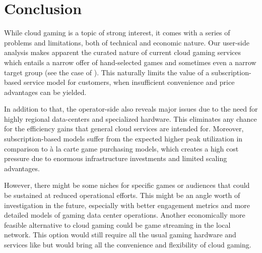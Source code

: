\section{Conclusion}
\label{sec:conclusion}

While cloud gaming is a topic of strong interest, it comes with a series of problems and limitations, both of technical and economic nature. Our user-side analysis makes apparent the curated nature of current cloud gaming services which entails a narrow offer of hand-selected games and sometimes even a narrow target group (see the case of \psnow). This naturally limits the value of a subscription-based service model for customers, when insufficient convenience and price advantages can be yielded.

In addition to that, the operator-side also reveals major issues due to the need for highly regional data-centers and specialized hardware. This eliminates any chance for the efficiency gains that general cloud services are intended for. Moreover, subscription-based models suffer from the expected higher peak utilization in comparison to à la carte game purchasing models, which creates a high cost pressure due to enormous infrastructure investments and limited scaling advantages.

However, there might be some niches for specific games or audiences that could be sustained at reduced operational efforts. This might be an angle worth of investigation in the future, especially with better engagement metrics and more detailed models of gaming data center operations. Another economically more feasible alternative to cloud gaming could be game streaming in the local network. This option would still require all the usual gaming hardware and services like \steam but would bring all the convenience and flexibility of cloud gaming.
